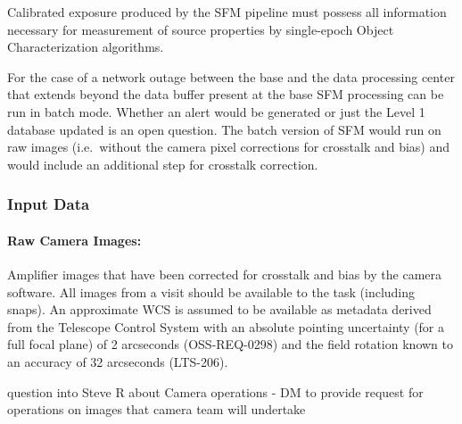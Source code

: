 
Calibrated exposure produced by the SFM pipeline must possess all information necessary for measurement of source properties by single-epoch Object Characterization algorithms.

For the case of a network outage between the base and the data processing center that extends beyond the data buffer present at the base SFM processing can be run in batch mode. Whether an alert would be generated or just the Level 1 database updated is an open question. The batch version of SFM would run on 
raw images (i.e.\ without the camera pixel corrections for crosstalk and bias) and would include an additional step for crosstalk correction.

\subsubsection{Input Data}
\paragraph*{Raw Camera Images:} Amplifier images that have been corrected for crosstalk and bias by the camera software. All images from a visit should be available to the task (including snaps). An approximate WCS is assumed to be available as metadata derived from the Telescope Control System with an absolute pointing uncertainty (for a full focal plane) of 2 arcseconds (OSS-REQ-0298) and the field rotation known to an accuracy of 32 arcseconds (LTS-206).
\begin{note}
question into Steve R about Camera operations - DM to provide request for operations on images that camera team will undertake
\end{note}


